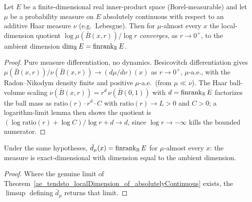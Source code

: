 \begin{theorem}\label{ae_tendsto_localDimension_of_absolutelyContinuous}
  \leanok
  Let \(E\) be a finite-dimensional real inner-product space (Borel-measurable) and let \(\mu\)
  be a probability measure on \(E\) absolutely continuous with respect to an additive Haar measure
  \(\nu\) (e.g.\ Lebesgue). Then for \(\mu\)-almost every \(x\) the local-dimension quotient
  \(\log \mu(\bar B(x,r)) / \log r\) \emph{converges}, as \(r \to 0^+\), to the ambient dimension
  \(\dim_{\mathbb{R}} E = \operatorname{finrank}_{\mathbb{R}} E\).
\end{theorem}
\begin{proof}\leanok
  Pure measure differentiation, no dynamics. Besicovitch differentiation gives
  \(\mu(\bar B(x,r))/\nu(\bar B(x,r)) \to (d\mu/d\nu)(x)\) as \(r \to 0^+\), \(\mu\)-a.e., with
  the Radon--Nikodym density finite and positive \(\mu\)-a.e.\ (from \(\mu \ll \nu\)). The Haar
  ball-volume scaling \(\nu(\bar B(x,r)) = r^{d}\,\nu(\bar B(0,1))\) with
  \(d = \operatorname{finrank}_{\mathbb{R}} E\) factorizes the ball mass as
  \(\text{ratio}(r) \cdot r^d \cdot C\) with \(\text{ratio}(r) \to L > 0\) and \(C > 0\); a
  logarithm-limit lemma then shows the quotient is \((\log \text{ratio}(r) + \log C)/\log r + d
  \to d\), since \(\log r \to -\infty\) kills the bounded numerator.
\end{proof}

\begin{corollary}\label{ae_localDimension_eq_finrank}
  \leanok
  Under the same hypotheses, \(\bar d_\mu(x) = \operatorname{finrank}_{\mathbb{R}} E\) for \(\mu\)-almost
  every \(x\): the measure is exact-dimensional with dimension equal to the ambient dimension.
\end{corollary}
\begin{proof}\leanok
  Where the genuine limit of Theorem~\ref{ae_tendsto_localDimension_of_absolutelyContinuous}
  exists, the \(\limsup\) defining \(\bar d_\mu\) returns that limit.
\end{proof}

